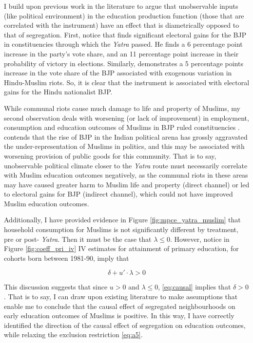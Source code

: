 \documentclass{article}
\begin{document}
I build upon previous work in the literature to argue that unobservable inputs (like political environment) in the education production function (those that are correlated with the instrument) have an effect that is diametrically opposed to that of segregation. First, notice that \cite{blakeslee.2018} finds significant electoral gains for the BJP in constituencies through which the \textit{Yatra} passed. He finds a 6 percentage point increase in the party's vote share, and an 11 percentage point increase in their probability of victory in elections. Similarly, \cite{iyer2015religious} demonstrates a 5 percentage points increase in the vote share of the BJP associated with exogenous variation in Hindu-Muslim riots. So, it is clear that the instrument is associated with electoral gains for the Hindu nationalist BJP. 

While communal riots cause much damage to life and property of Muslims, my second observation deals with worsening (or lack of improvement) in employment, consumption and education outcomes of Muslims in BJP ruled constituencies \citep{mitul2020bjp}. \cite{farooqui2020political} contends that the rise of BJP in the Indian political arena has grossly aggravated the under-representation of Muslims in politics, and this may be associated with worsening provision of public goods for this community. That is to say, unobservable political climate closer to the \textit{Yatra} route must necessarily correlate with Muslim education outcomes negatively, as the communal riots in these areas may have caused greater harm to Muslim life and property (direct channel) or led to electoral gains for BJP (indirect channel), which could not have improved Muslim education outcomes.  

Additionally, I have provided evidence in Figure \ref{fig:mpce_yatra_muslim} that household consumption for Muslims is not significantly different by treatment, pre or post- \textit{Yatra}. Then it must be the case that $\lambda \leq 0$. However, notice in Figure \ref{fig:coeff_pri_iv} IV estimates for attainment of primary education, for cohorts born between 1981-90, imply that

\begin{equation}\label{eq:causal}
\delta + u' \cdot \lambda > 0
\end{equation}

This discussion suggests that since $u > 0$ and $\lambda \leq 0$, \eqref{eq:causal} implies that $\delta > 0$. That is to say, I can draw upon existing literature to make assumptions that enable me to conclude that the causal effect of segregated neighbourhoods on early education outcomes of Muslims is positive. In this way, I have correctly identified the direction of the causal effect of segregation on education outcomes, while relaxing the exclusion restriction \eqref{eq:a5}. 
\end{document}

